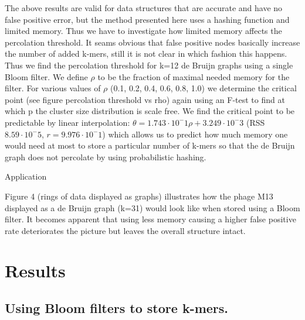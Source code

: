 \documentclass[12pt]{article} \usepackage{simplemargins}
\begin{document}
The above results are valid for data structures that are accurate and have no false positive error,
but the method presented here uses a hashing function and limited memory. Thus we have to investigate
how limited memory affects the percolation threshold. It seams obvious that false positive nodes 
basically increase the number of added k-mers, still it is not clear in which fashion this happens.
Thus we find the percolation threshold for k=12 de Bruijn graphs using a single Bloom filter. We define
$\rho$ to be the fraction of maximal needed memory for the filter. For various values of $\rho$ (0.1, 0.2, 0.4, 0.6, 0.8, 1.0)
we determine the critical point (see figure percolation threshold vs rho) again using an F-test to find
at which p the cluster size distribution is scale free. We find the critical point to be predictable
by linear interpolation:
$\theta = 1.743 \cdot 10^-1 \rho + 3.249 \cdot 10^-3$ (RSS $8.59 \cdot 10^-5$, $r=9.976 \cdot 10^-1$)
which allows us to predict how much memory one would need at most to store a particular number of k-mers
so that the de Bruijn graph does not percolate by using probabilistic hashing.


Application

Figure 4 (rings of data displayed as graphs) illustrates how the phage M13 displayed as a de 
Bruijn graph (k=31) would look like when stored using a Bloom filter. It becomes apparent 
that using less memory causing a higher false positive rate deteriorates the picture but 
leaves the overall structure intact.


\section{Results}

\subsection{Using Bloom filters to store k-mers.}
\end{document}
